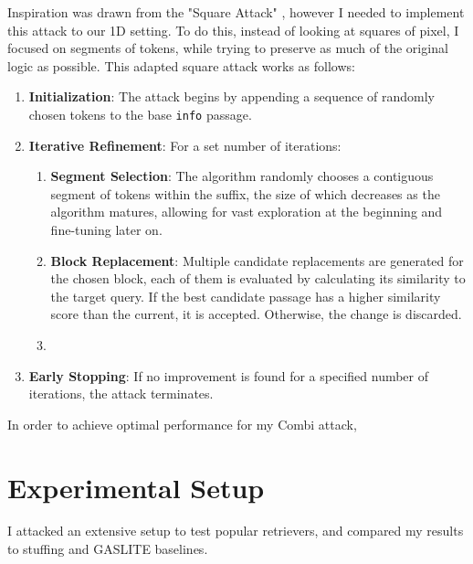 \documentclass[a4paper, sigconf]{acmart}
\begin{document}
Inspiration was drawn from the "Square Attack" \cite{andriushchenko2020}, however I needed to implement this attack to our 1D setting. To do this, instead of looking at squares of pixel, I focused on segments of tokens, while trying to preserve as much of the original logic as possible. This adapted square attack works as follows:

\begin{enumerate}
  \item \textbf{Initialization}: The attack begins by appending a sequence of randomly chosen tokens to the base \texttt{info} passage. 
  \item \textbf{Iterative Refinement}: For a set number of iterations: 
  \begin{enumerate}
    \item \textbf{Segment Selection}: The algorithm randomly chooses a contiguous segment of tokens within the suffix, the size of which decreases as the algorithm matures, allowing for vast exploration at the beginning and fine-tuning later on. 
    \item \textbf{Block Replacement}: Multiple candidate replacements are generated for the chosen block, each of them is evaluated by calculating its similarity to the target query. If the best candidate passage has a higher similarity score than the current, it is accepted. Otherwise, the change is discarded. 
  \item 
  \end{enumerate}
  \item \textbf{Early Stopping}: If no improvement is found for a specified number of iterations, the attack terminates.
\end{enumerate}
 
 
 






In order to achieve optimal performance for my Combi attack, 






\section{Experimental Setup}

I attacked an extensive setup to test popular retrievers, and compared my results to stuffing and GASLITE baselines.
\end{document}
